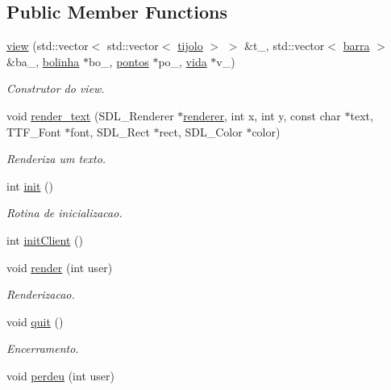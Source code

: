 \subsection*{Public Member Functions}
\begin{DoxyCompactItemize}
\item 
\hyperlink{classview_a809bdce6090439ac99ab0e5856c130e2}{view} (std\+::vector$<$ std\+::vector$<$ \hyperlink{classtijolo}{tijolo} $>$ $>$ \&t\+\_\+, std\+::vector$<$ \hyperlink{classbarra}{barra} $>$ \&ba\+\_\+, \hyperlink{classbolinha}{bolinha} $\ast$bo\+\_\+, \hyperlink{classpontos}{pontos} $\ast$po\+\_\+, \hyperlink{classvida}{vida} $\ast$v\+\_\+)
\begin{DoxyCompactList}\small\item\em Construtor do view. \end{DoxyCompactList}\item 
void \hyperlink{classview_afa73cff596b36c7009ee17383d039750}{render\+\_\+text} (S\+D\+L\+\_\+\+Renderer $\ast$\hyperlink{classview_a8d7b3ec0a0641d24cdc3b04949f5df45}{renderer}, int x, int y, const char $\ast$text, T\+T\+F\+\_\+\+Font $\ast$font, S\+D\+L\+\_\+\+Rect $\ast$rect, S\+D\+L\+\_\+\+Color $\ast$color)
\begin{DoxyCompactList}\small\item\em Renderiza um texto. \end{DoxyCompactList}\item 
int \hyperlink{classview_a21d953772b41dd9c08c9ea9895e002d7}{init} ()
\begin{DoxyCompactList}\small\item\em Rotina de inicializacao. \end{DoxyCompactList}\item 
int \hyperlink{classview_ac0e552fdef69accb371177ef955e1b38}{init\+Client} ()
\item 
void \hyperlink{classview_a6ce9703fff0ea8ae911fee1d24a418e0}{render} (int user)
\begin{DoxyCompactList}\small\item\em Renderizacao. \end{DoxyCompactList}\item 
void \hyperlink{classview_ad8c046a243e52ee4f902abec6fbec9bb}{quit} ()
\begin{DoxyCompactList}\small\item\em Encerramento. \end{DoxyCompactList}\item 
void \hyperlink{classview_a23918beecf637e8226bc1ff64a67e811}{perdeu} (int user)

\end{DoxyCompactItemize}

